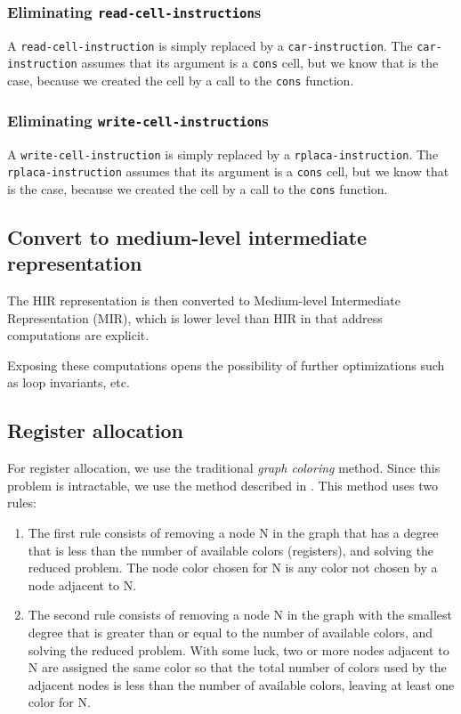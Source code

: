 \subsubsection{Eliminating \texttt{read-cell-instruction}s}

A \texttt{read-cell-instruction} is simply replaced by a
\texttt{car-instruction}.  The \texttt{car-instruction} assumes that
its argument is a \texttt{cons} cell, but we know that is the case,
because we created the cell by a call to the \texttt{cons} function.

\subsubsection{Eliminating \texttt{write-cell-instruction}s}

A \texttt{write-cell-instruction} is simply replaced by a
\texttt{rplaca-instruction}.  The \texttt{rplaca-instruction} assumes
that its argument is a \texttt{cons} cell, but we know that is the
case, because we created the cell by a call to the \texttt{cons}
function.

\subsection{Convert to medium-level intermediate representation}

The HIR representation is then converted to Medium-level Intermediate
Representation (MIR), which is lower level than HIR in that address
computations are explicit.

Exposing these computations opens the possibility of further
optimizations such as loop invariants, etc.

\subsection{Register allocation}

For register allocation, we use the traditional \emph{graph coloring}
method.  Since this problem is intractable, we use the method
described in \cite{Muchnick:1998:ACD:286076}.  This method uses two
rules:

\begin{enumerate}
\item The first rule consists of removing a node N in the graph that
  has a degree that is less than the number of available colors
  (registers), and solving the reduced problem.  The node color chosen
  for N is any color not chosen by a node adjacent to N.
\item The second rule consists of removing a node N in the graph with
  the smallest degree that is greater than or equal to the number of
  available colors, and solving the reduced problem.  With some luck,
  two or more nodes adjacent to N are assigned the same color so that
  the total number of colors used by the adjacent nodes is less than
  the number of available colors, leaving at least one color for N.
\end{enumerate}

